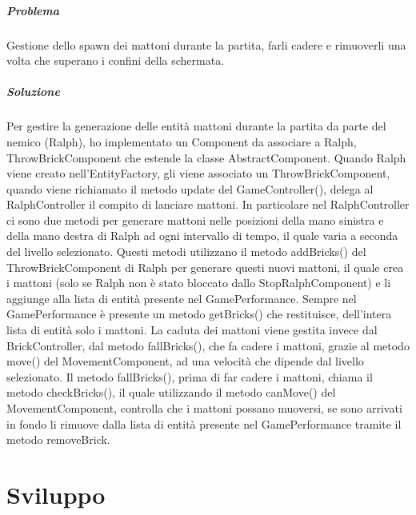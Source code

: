 \documentclass[a4paper,12pt]{report}
\begin{document}
\paragraph{Problema} Gestione dello spawn dei mattoni durante la partita, farli cadere e rimuoverli una volta che superano i confini della schermata.

\paragraph{Soluzione} Per gestire la generazione delle entità mattoni durante la partita da parte del nemico (Ralph), ho implementato un Component da associare a Ralph, ThrowBrickComponent che estende la classe AbstractComponent. Quando Ralph viene creato nell'EntityFactory, gli viene associato un ThrowBrickComponent, quando viene richiamato il metodo update del GameController(), delega al RalphController il compito di lanciare mattoni. In particolare nel RalphController ci sono due metodi per generare mattoni nelle posizioni della mano sinistra e della mano destra di Ralph ad ogni intervallo di tempo, il quale varia a seconda del livello selezionato. 
Questi metodi utilizzano il metodo addBricks() del ThrowBrickComponent di Ralph per generare questi nuovi mattoni, il quale crea i mattoni (solo se Ralph non è stato bloccato dallo StopRalphComponent) e li aggiunge alla lista di entità presente nel GamePerformance. Sempre nel GamePerformance è presente un metodo getBricks() che restituisce, dell'intera lista di entità solo i mattoni. La caduta dei mattoni viene gestita invece dal BrickController, dal metodo fallBricks(), che fa cadere i mattoni, grazie al metodo move() del MovementComponent, ad una velocità che dipende dal livello selezionato. Il metodo fallBricks(), prima di far cadere i mattoni, chiama il metodo checkBricks(), il quale utilizzando il metodo canMove() del MovementComponent, controlla che i mattoni possano muoversi, se sono arrivati in fondo li rimuove dalla lista di entità presente nel GamePerformance tramite il metodo removeBrick. 

\chapter{Sviluppo}
\end{document}

